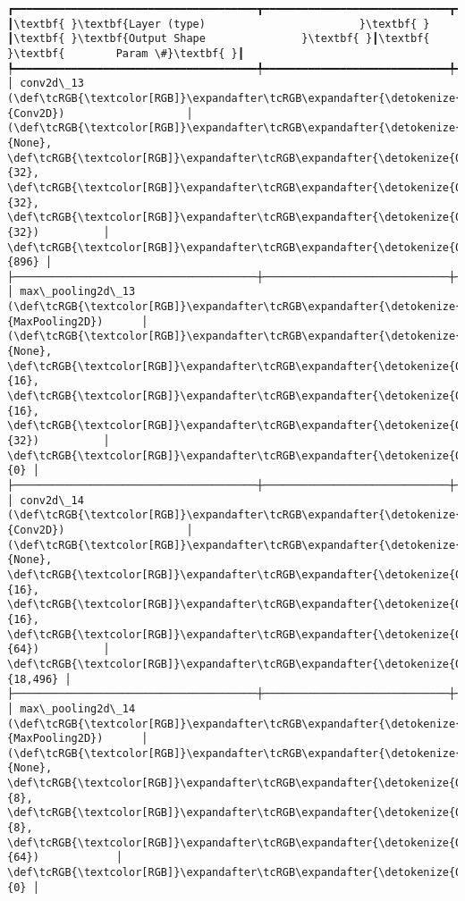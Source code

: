 \documentclass[11pt]{article}
\begin{document}
    \begin{Verbatim}[commandchars=\\\{\}]
┏━━━━━━━━━━━━━━━━━━━━━━━━━━━━━━━━━━━━━━┳━━━━━━━━━━━━━━━━━━━━━━━━━━━━━┳━━━━━━━━━━━━━━━━━┓
┃\textbf{ }\textbf{Layer (type)                        }\textbf{ }┃\textbf{ }\textbf{Output Shape               }\textbf{ }┃\textbf{ }\textbf{        Param \#}\textbf{ }┃
┡━━━━━━━━━━━━━━━━━━━━━━━━━━━━━━━━━━━━━━╇━━━━━━━━━━━━━━━━━━━━━━━━━━━━━╇━━━━━━━━━━━━━━━━━┩
│ conv2d\_13 (\def\tcRGB{\textcolor[RGB]}\expandafter\tcRGB\expandafter{\detokenize{0,135,255}}{Conv2D})                   │ (\def\tcRGB{\textcolor[RGB]}\expandafter\tcRGB\expandafter{\detokenize{0,215,255}}{None}, \def\tcRGB{\textcolor[RGB]}\expandafter\tcRGB\expandafter{\detokenize{0,175,0}}{32}, \def\tcRGB{\textcolor[RGB]}\expandafter\tcRGB\expandafter{\detokenize{0,175,0}}{32}, \def\tcRGB{\textcolor[RGB]}\expandafter\tcRGB\expandafter{\detokenize{0,175,0}}{32})          │             \def\tcRGB{\textcolor[RGB]}\expandafter\tcRGB\expandafter{\detokenize{0,175,0}}{896} │
├──────────────────────────────────────┼─────────────────────────────┼─────────────────┤
│ max\_pooling2d\_13 (\def\tcRGB{\textcolor[RGB]}\expandafter\tcRGB\expandafter{\detokenize{0,135,255}}{MaxPooling2D})      │ (\def\tcRGB{\textcolor[RGB]}\expandafter\tcRGB\expandafter{\detokenize{0,215,255}}{None}, \def\tcRGB{\textcolor[RGB]}\expandafter\tcRGB\expandafter{\detokenize{0,175,0}}{16}, \def\tcRGB{\textcolor[RGB]}\expandafter\tcRGB\expandafter{\detokenize{0,175,0}}{16}, \def\tcRGB{\textcolor[RGB]}\expandafter\tcRGB\expandafter{\detokenize{0,175,0}}{32})          │               \def\tcRGB{\textcolor[RGB]}\expandafter\tcRGB\expandafter{\detokenize{0,175,0}}{0} │
├──────────────────────────────────────┼─────────────────────────────┼─────────────────┤
│ conv2d\_14 (\def\tcRGB{\textcolor[RGB]}\expandafter\tcRGB\expandafter{\detokenize{0,135,255}}{Conv2D})                   │ (\def\tcRGB{\textcolor[RGB]}\expandafter\tcRGB\expandafter{\detokenize{0,215,255}}{None}, \def\tcRGB{\textcolor[RGB]}\expandafter\tcRGB\expandafter{\detokenize{0,175,0}}{16}, \def\tcRGB{\textcolor[RGB]}\expandafter\tcRGB\expandafter{\detokenize{0,175,0}}{16}, \def\tcRGB{\textcolor[RGB]}\expandafter\tcRGB\expandafter{\detokenize{0,175,0}}{64})          │          \def\tcRGB{\textcolor[RGB]}\expandafter\tcRGB\expandafter{\detokenize{0,175,0}}{18,496} │
├──────────────────────────────────────┼─────────────────────────────┼─────────────────┤
│ max\_pooling2d\_14 (\def\tcRGB{\textcolor[RGB]}\expandafter\tcRGB\expandafter{\detokenize{0,135,255}}{MaxPooling2D})      │ (\def\tcRGB{\textcolor[RGB]}\expandafter\tcRGB\expandafter{\detokenize{0,215,255}}{None}, \def\tcRGB{\textcolor[RGB]}\expandafter\tcRGB\expandafter{\detokenize{0,175,0}}{8}, \def\tcRGB{\textcolor[RGB]}\expandafter\tcRGB\expandafter{\detokenize{0,175,0}}{8}, \def\tcRGB{\textcolor[RGB]}\expandafter\tcRGB\expandafter{\detokenize{0,175,0}}{64})            │               \def\tcRGB{\textcolor[RGB]}\expandafter\tcRGB\expandafter{\detokenize{0,175,0}}{0} │

\end{Verbatim}
\end{document}
